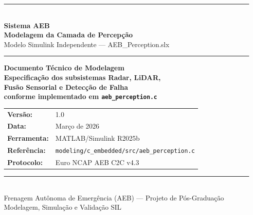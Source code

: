 \documentclass[12pt,a4paper]{article}
\begin{document}
\begin{titlepage}
  \begin{center}
    \vspace*{1.5cm}
    {\color{azulescuro}\rule{\linewidth}{2pt}}\\[0.4cm]
    {\Huge\bfseries\color{azulescuro} Sistema AEB}\\[0.3cm]
    {\LARGE\bfseries\color{azulmedio} Modelagem da Camada de Percep\c{c}\~ao}\\[0.2cm]
    {\large\color{azulmedio} Modelo Simulink Independente --- AEB\_Perception.slx}\\[0.2cm]
    {\color{azulescuro}\rule{\linewidth}{2pt}}

    \vspace{1.8cm}
    \begin{tcolorbox}[enhanced,
      colback=azulclaro!30, colframe=azulmedio,
      width=0.85\linewidth, halign=center,
      top=10pt, bottom=10pt]
      \large\bfseries\color{azulescuro}
      Documento T\'ecnico de Modelagem\\[0.3cm]
      \normalsize\normalfont\color{black}
      Especifica\c{c}\~ao dos subsistemas Radar, LiDAR,\\
      Fus\~ao Sensorial e Detec\c{c}\~ao de Falha\\
      conforme implementado em \texttt{aeb\_perception.c}
    \end{tcolorbox}

    \vspace{1.5cm}
    \begin{tabular}{ll}
      \textbf{Vers\~ao:}    & 1.0 \\[4pt]
      \textbf{Data:}        & Mar\c{c}o de 2026 \\[4pt]
      \textbf{Ferramenta:}  & MATLAB/Simulink R2025b \\[4pt]
      \textbf{Refer\^encia:} & \texttt{modeling/c\_embedded/src/aeb\_perception.c} \\[4pt]
      \textbf{Protocolo:}   & Euro NCAP AEB C2C v4.3 \\
    \end{tabular}

    \vfill
    {\color{azulescuro}\rule{\linewidth}{1pt}}\\[0.3cm]
    {\small\color{gray}
      Frenagem Aut\^onoma de Emerg\^encia (AEB) --- Projeto de P\'os-Gradua\c{c}\~ao\\
      Modelagem, Simula\c{c}\~ao e Valida\c{c}\~ao SIL
    }
  \end{center}
\end{titlepage}
\end{document}
